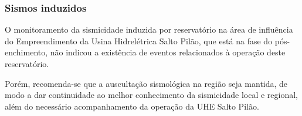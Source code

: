 \subsubsection{Sismos induzidos}
\par{O monitoramento da sismicidade induzida por reservatório na área de influência do Empreendimento da Usina Hidrelétrica Salto Pilão, que está na fase do pós-enchimento, não indicou a existência de eventos relacionados à operação deste reservatório.}
\par{Porém, recomenda-se que a auscultação sismológica na região seja mantida, de modo a dar continuidade ao melhor conhecimento da sismicidade local e regional, além do necessário acompanhamento da operação da UHE Salto Pilão.}

